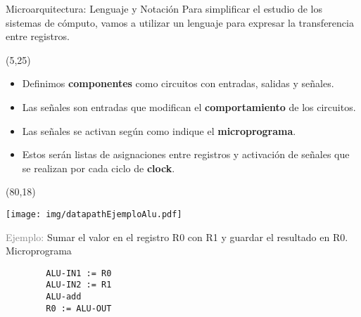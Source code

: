 \documentclass[aspectratio=169]{beamer}
\begin{document}
\begin{frame}[fragile,t]{Microarquitectura: Lenguaje y Notación}
    Para simplificar el estudio de los sistemas de cómputo, vamos a utilizar un lenguaje para expresar la transferencia entre registros.
    \begin{textblock}{70}(5,25)
    \begin{itemize}
    \setlength\itemsep{0.2cm}
    \item Definimos \textbf{componentes} como circuitos con entradas, salidas y señales.
    \item Las señales son entradas que modifican el \textbf{comportamiento} de los circuitos.
    \item Las señales se activan según como indique el \textbf{microprograma}.
    \item Estos serán listas de asignaciones entre registros y activación de señales que se realizan por cada ciclo de \textbf{clock}.
    \end{itemize}
    \end{textblock}
    \begin{textblock}{70}(80,18)
    \begin{center}
    \texttt{[image: img/datapathEjemploAlu.pdf]}
    \end{center}
    \vspace{-0.3cm}
    \small
    \textcolor{gray}{Ejemplo:}
    Sumar el valor en el registro R0 con R1 y guardar el resultado en R0.\\
    \textcolor{verdeuca}{Microprograma}\\
    \vspace{-0.3cm}
    \begin{verbatim}
        ALU-IN1 := R0
        ALU-IN2 := R1
        ALU-add
        R0 := ALU-OUT
    \end{verbatim}
    \end{textblock}
\end{frame}
\end{document}
